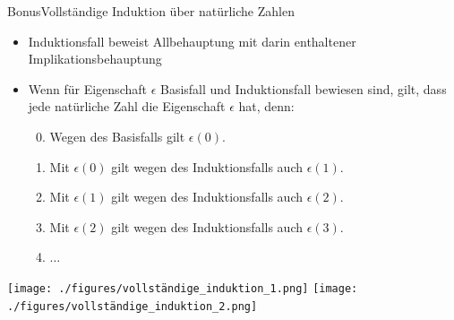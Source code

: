 \begin{frame}[allowframebreaks]{Bonus}{Vollständige Induktion über natürliche Zahlen\vspace{0.5cm}}
\begin{itemize}
  \end{itemize}
  \begin{itemize}
    \item Induktionsfall beweist Allbehauptung mit darin enthaltener Implikationsbehauptung 
    \item Wenn für Eigenschaft $\epsilon$ Basisfall und Induktionsfall bewiesen sind, gilt, dass jede natürliche Zahl die Eigenschaft $\epsilon$ hat, denn:
    \begin{enumerate}
      \setcounter{enumi}{-1}
      \item Wegen des Basisfalls gilt $\epsilon(0)$.
      \item Mit $\epsilon(0)$ gilt wegen des Induktionsfalls auch $\epsilon(1)$.
      \item Mit $\epsilon(1)$ gilt wegen des Induktionsfalls auch $\epsilon(2)$.
      \item Mit $\epsilon(2)$ gilt wegen des Induktionsfalls auch $\epsilon(3)$.
      \item $\ldots$
    \end{enumerate}
  \end{itemize}
  \texttt{[image: ./figures/vollständige\_induktion\_1.png]}
  \texttt{[image: ./figures/vollständige\_induktion\_2.png]}
\end{frame}

